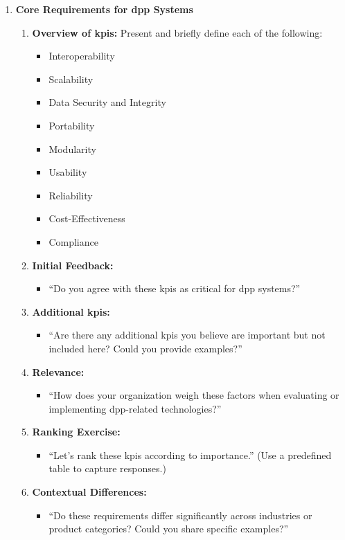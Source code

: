 \begin{enumerate}
    \item \textbf{Core Requirements for \ac{dpp} Systems}
    \begin{enumerate}
        \item \textbf{Overview of \ac{kpi}s:} Present and briefly define each of the following:
        \begin{itemize}
            \item Interoperability
            \item Scalability
            \item Data Security and Integrity
            \item Portability
            \item Modularity
            \item Usability
            \item Reliability
            \item Cost-Effectiveness
            \item Compliance
        \end{itemize}
        \item \textbf{Initial Feedback:} 
        \begin{itemize}
            \item ``Do you agree with these \ac{kpi}s as critical for \ac{dpp} systems?''
        \end{itemize}
        \item \textbf{Additional \ac{kpi}s:} 
        \begin{itemize}
            \item ``Are there any additional \ac{kpi}s you believe are important but not included here? Could you provide examples?''
        \end{itemize}
        \item \textbf{Relevance:} 
        \begin{itemize}
            \item ``How does your organization weigh these factors when evaluating or implementing \ac{dpp}-related technologies?''
        \end{itemize}
        \item \textbf{Ranking Exercise:} 
        \begin{itemize}
            \item ``Let’s rank these \ac{kpi}s according to importance.'' (Use a predefined table to capture responses.)
        \end{itemize}
        \item \textbf{Contextual Differences:} 
        \begin{itemize}
            \item ``Do these requirements differ significantly across industries or product categories? Could you share specific examples?''
        \end{itemize}
    \end{enumerate}


\end{enumerate}
